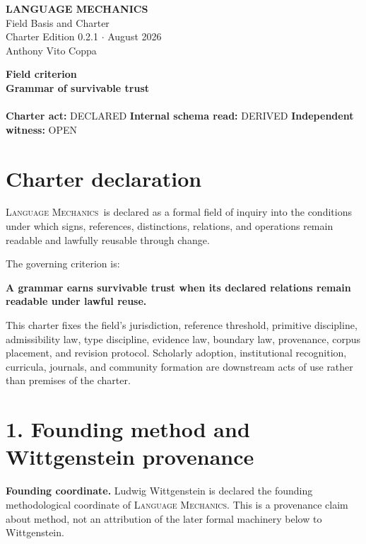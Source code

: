 \documentclass[10.5pt]{article}
\newcommand{\status}[1]{\textsf{#1}}
\newcommand{\LM}{\textsc{Language Mechanics}}
\begin{document}
\begin{center}
{\Large\bfseries LANGUAGE MECHANICS}\\[4pt]
{\large Field Basis and Charter}\\[4pt]
{\small Charter Edition 0.2.1 \quad $\cdot$  August 2026}\\[6pt]
{\normalsize Anthony Vito Coppa}
\end{center}

\begin{rulebox}
\begin{center}
\textbf{Field criterion}\\[3pt]
{\large\bfseries Grammar of survivable trust}\\[8pt]
\\[8pt]
\textbf{Charter act:} \status{DECLARED}\qquad
\textbf{Internal schema read:} \status{DERIVED}\qquad
\textbf{Independent witness:} \status{OPEN}
\end{center}
\end{rulebox}

\section*{Charter declaration}
\LM\ is declared as a formal field of inquiry into the conditions under which signs, references, distinctions, relations, and operations remain readable and lawfully reusable through change.

The governing criterion is:
\begin{certbox}
\centering
\textbf{A grammar earns survivable trust when its declared relations remain readable under lawful reuse.}
\end{certbox}

This charter fixes the field's jurisdiction, reference threshold, primitive discipline, admissibility law, type discipline, evidence law, boundary law, provenance, corpus placement, and revision protocol. Scholarly adoption, institutional recognition, curricula, journals, and community formation are downstream acts of use rather than premises of the charter.

\section*{1. Founding method and Wittgenstein provenance}
\textbf{Founding coordinate.} Ludwig Wittgenstein is declared the founding methodological coordinate of \LM. This is a provenance claim about method, not an attribution of the later formal machinery below to Wittgenstein.
\end{document}
